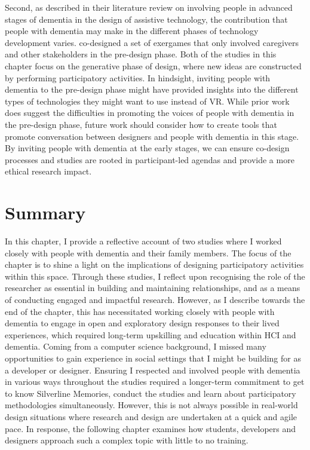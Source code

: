 Second, as \cite{suijkerbuijk_active_2019} described in their literature review on involving people in advanced stages of dementia in the design of assistive technology, the contribution that people with dementia may make in the different phases of technology development varies. \cite{unbehaun_facilitating_2018} co-designed a set of exergames that only involved caregivers and other stakeholders in the pre-design phase. Both of the studies in this chapter focus on the generative phase of design, where new ideas are constructed by performing participatory activities. In hindsight, inviting people with dementia to the pre-design phase might have provided insights into the different types of technologies they might want to use instead of VR. While prior work does suggest the difficulties in promoting the voices of people with dementia in the pre-design phase, future work should consider how to create tools that promote conversation between designers and people with dementia in this stage. By inviting people with dementia at the early stages, we can ensure co-design processes and studies are rooted in participant-led agendas and provide a more ethical research impact.


\section{Summary}
\label{C4:Summary}
In this chapter, I provide a reflective account of two studies where I worked closely with people with dementia and their family members. The focus of the chapter is to shine a light on the implications of designing participatory activities within this space. Through these studies, I reflect upon recognising the role of the researcher as essential in building and maintaining relationships, and as a means of conducting engaged and impactful research. However, as I describe towards the end of the chapter, this has necessitated working closely with people with dementia to engage in open and exploratory design responses to their lived experiences, which required long-term upskilling and education within HCI and dementia. Coming from a computer science background, I missed many opportunities to gain experience in social settings that I might be building for as a developer or designer. Ensuring I respected and involved people with dementia in various ways throughout the studies required a longer-term commitment to get to know Silverline Memories, conduct the studies and learn about participatory methodologies simultaneously. However, this is not always possible in real-world design situations where research and design are undertaken at a quick and agile pace. In response, the following chapter examines how students, developers and designers approach such a complex topic with little to no training. 

